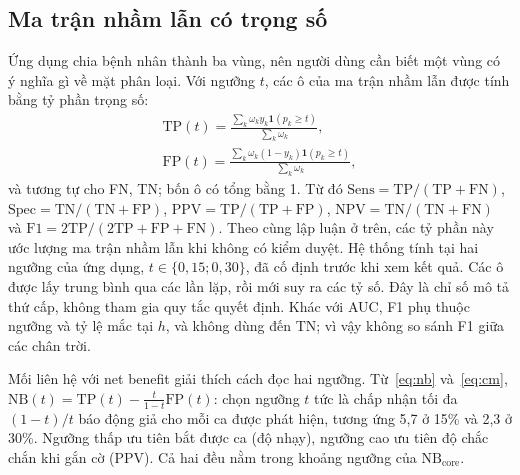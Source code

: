 \documentclass[journal]{IEEEtran}
\begin{document}
\subsection{Ma trận nhầm lẫn có trọng số}\label{sec:confusion}
Ứng dụng chia bệnh nhân thành ba vùng, nên người dùng cần biết một vùng có ý nghĩa gì về mặt phân loại. Với ngưỡng $t$, các ô của ma trận nhầm lẫn được tính bằng tỷ phần trọng số:
\begin{equation}\label{eq:cm}
\begin{gathered}
\mathrm{TP}(t)=\frac{\sum_k\omega_ky_k\bm 1(p_k\ge t)}{\sum_k\omega_k},\\
\mathrm{FP}(t)=\frac{\sum_k\omega_k(1-y_k)\bm 1(p_k\ge t)}{\sum_k\omega_k},
\end{gathered}
\end{equation}
và tương tự cho FN, TN; bốn ô có tổng bằng 1. Từ đó $\mathrm{Sens}=\mathrm{TP}/(\mathrm{TP}+\mathrm{FN})$, $\mathrm{Spec}=\mathrm{TN}/(\mathrm{TN}+\mathrm{FP})$, $\mathrm{PPV}=\mathrm{TP}/(\mathrm{TP}+\mathrm{FP})$, $\mathrm{NPV}=\mathrm{TN}/(\mathrm{TN}+\mathrm{FN})$ và $\mathrm{F1}=2\mathrm{TP}/(2\mathrm{TP}+\mathrm{FP}+\mathrm{FN})$. Theo cùng lập luận ở trên, các tỷ phần này ước lượng ma trận nhầm lẫn khi không có kiểm duyệt. Hệ thống tính tại hai ngưỡng của ứng dụng, $t\in\{0{,}15;0{,}30\}$, đã cố định trước khi xem kết quả. Các ô được lấy trung bình qua các lần lặp, rồi mới suy ra các tỷ số. Đây là chỉ số mô tả thứ cấp, không tham gia quy tắc quyết định. Khác với AUC, F1 phụ thuộc ngưỡng và tỷ lệ mắc tại $h$, và không dùng đến TN; vì vậy không so sánh F1 giữa các chân trời.

Mối liên hệ với net benefit giải thích cách đọc hai ngưỡng. Từ~\eqref{eq:nb} và~\eqref{eq:cm}, $\mathrm{NB}(t)=\mathrm{TP}(t)-\frac{t}{1-t}\mathrm{FP}(t)$: chọn ngưỡng $t$ tức là chấp nhận tối đa $(1-t)/t$ báo động giả cho mỗi ca được phát hiện, tương ứng 5,7 ở 15\% và 2,3 ở 30\%. Ngưỡng thấp ưu tiên bắt được ca (độ nhạy), ngưỡng cao ưu tiên độ chắc chắn khi gắn cờ (PPV). Cả hai đều nằm trong khoảng ngưỡng của $\mathrm{NB}_{\text{core}}$.
\end{document}
